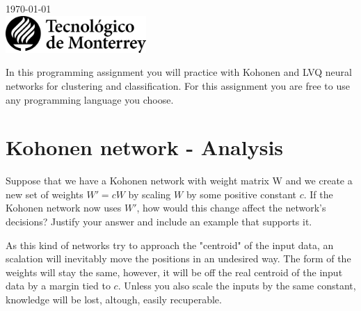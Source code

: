\documentclass{article}
\begin{document}
\begin{titlepage}


    {\large \today}\\[2cm] %


    \includegraphics[width=0.4\textwidth,height=\textheight,keepaspectratio]{../Assets/logo-tec-negro.png} %


    \vfill %

\end{titlepage}
In this programming assignment you will practice with Kohonen and LVQ neural networks for clustering and classification. For this assignment you are free to use any programming language you choose.
\section{Kohonen network - Analysis}
Suppose that we have a Kohonen network with weight matrix W and we create a new set of weights $W' = cW$ by scaling $W$ by some positive constant $c$. If the Kohonen network now uses $W'$, how would this change affect the network’s decisions? Justify your answer and include an example that supports it.

As this kind of networks try to approach the "centroid" of the input data, an scalation will inevitably move the positions in an undesired way. The form of the weights will stay the same, however, it will be off the real centroid of the input data by a margin tied to $c$. Unless you also scale the inputs by the same constant, knowledge will be lost, altough, easily recuperable.
\end{document}
